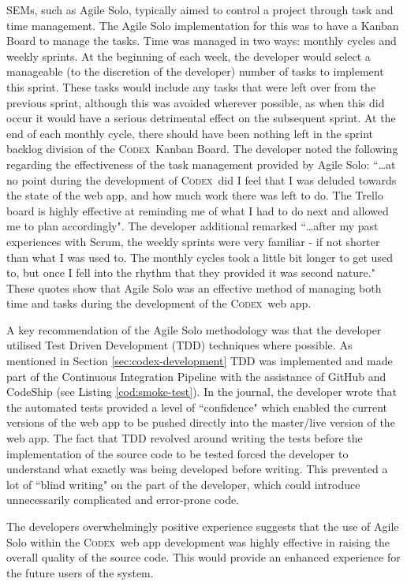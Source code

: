 \documentclass[final]{cmpreport}
\newcommand{\Codex}{\textsc{Codex}}
\begin{document}
		SEMs, such as Agile Solo, typically aimed to control a project through task and time management. The Agile Solo implementation for this was to have a Kanban Board to manage the tasks. Time was managed in two ways: monthly cycles and weekly sprints. At the beginning of each week, the developer would select a manageable (to the discretion of the developer) number of tasks to implement this sprint. These tasks would include any tasks that were left over from the previous sprint, although this was avoided wherever possible, as when this did occur it would have a serious detrimental effect on the subsequent sprint. At the end of each monthly cycle, there should have been nothing left in the sprint backlog division of the \Codex \ Kanban Board. The developer noted the following regarding the effectiveness of the task management provided by Agile Solo: ``\ldots at no point during the development of \Codex \ did I feel that I was deluded towards the state of the web app, and how much work there was left to do. The Trello board is highly effective at reminding me of what I had to do next and allowed me to plan accordingly". The developer additional remarked ``\ldots after my past experiences with Scrum, the weekly sprints were very familiar - if not shorter than what I was used to. The monthly cycles took a little bit longer to get used to, but once I fell into the rhythm that they provided it was second nature." These quotes show that Agile Solo was an effective method of managing both time and tasks during the development of the \Codex \ web app. 
		
		A key recommendation of the Agile Solo methodology was that the developer utilised Test Driven Development (TDD) techniques where possible. As mentioned in Section \ref{sec:codex-development} TDD was implemented and made part of the Continuous Integration Pipeline with the assistance of GitHub and CodeShip (see Listing \ref{cod:smoke-test}). In the journal, the developer wrote that the automated tests provided a level of ``confidence" which enabled the current versions of the web app to be pushed directly into the master/live version of the web app. The fact that TDD revolved around writing the tests before the implementation of the source code to be tested forced the developer to understand what exactly was being developed before writing. This prevented a lot of ``blind writing" on the part of the developer, which could introduce unnecessarily complicated and error-prone code. 
		
		The developers overwhelmingly positive experience suggests that the use of Agile Solo within the \Codex \ web app development was highly effective in raising the overall quality of the source code. This would provide an enhanced experience for the future users of the system. 		
\end{document}
